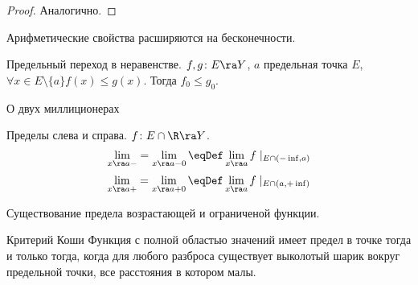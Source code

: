\begin{proof}
Аналогично.
\end{proof}

\begin{Rem}
Арифметические свойства расширяются на бесконечности.
\end{Rem}

\begin{theorem}{Предельный переход в неравенстве.}
$f, g\colon E \ra Y$, $a$ предельная точка $E$, $\forall x \in E\setminus \{a\} f(x) \leqslant g(x)$. Тогда $f_0 \leqslant g_0$.
\end{theorem}

\begin{theorem}{О двух миллиционерах}
\end{theorem}

\begin{Def}
Пределы слева и справа. $f\colon E \cap \R \ra Y$.
$$\lim\limits_{x\ra a-} = \lim\limits_{x\ra a-0} \eqDef \lim\limits_{x\ra a} f\mid_{E\cap(-\inf,a)}$$
$$\lim\limits_{x\ra a+} = \lim\limits_{x\ra a+0} \eqDef \lim\limits_{x\ra a} f\mid_{E\cap(a,+\inf)}$$
\end{Def}

\begin{theorem}{Существование предела возрастающей и ограниченой функции.}

\end{theorem}

\begin{theorem}{Критерий Коши}
Функция с полной областью значений имеет предел в точке тогда и только тогда, когда для любого разброса существует выколотый шарик вокруг предельной точки, все расстояния в котором малы.
\end{theorem}
